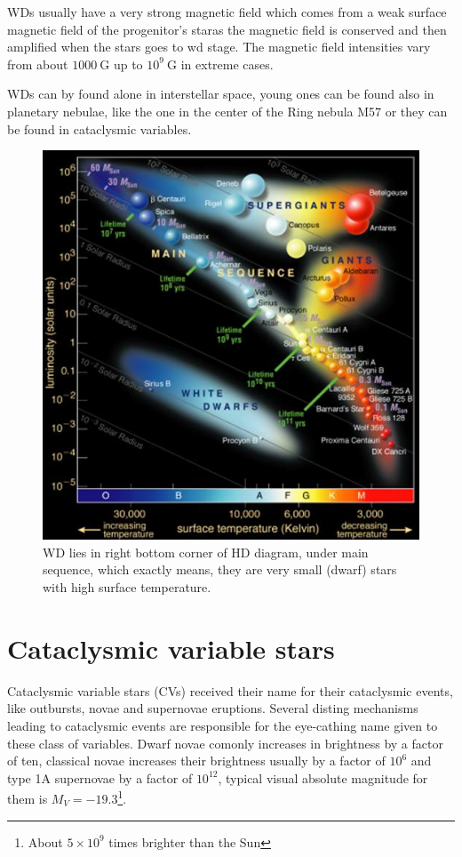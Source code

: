 \documentclass[oneside,a4paper,11pt]{report}
\begin{document}
WDs usually have a very strong magnetic field which comes from a weak surface magnetic field of the progenitor's staras the magnetic 
field is conserved and then amplified when the stars goes to wd stage.  
The magnetic field intensities vary from about $1000 \:\mathrm{G}$ up to $10^9 \:\mathrm{G}$ in extreme cases.    

WDs can by found alone in interstellar space, young ones can be found also in planetary nebulae, like the one in the center of the Ring nebula 
M57 or they can be found in cataclysmic variables.       
 
\begin{figure}[hbt!]
\centering
\includegraphics[totalheight=12cm]{hrdiagram}
\caption{WD lies in right bottom corner of HD diagram, under main 
sequence, which exactly means, they are very small (dwarf) stars with high surface temperature.  }
\label{hrd1} 
\end{figure}


\chapter{Cataclysmic variable stars}

Cataclysmic variable stars (CVs) received their name for their cataclysmic events, like outbursts, novae and supernovae eruptions. 
Several disting mechanisms leading to cataclysmic events are responsible for the eye-cathing name given to these class of variables. 
Dwarf novae comonly increases in brightness by a factor of ten, classical novae increases their 
brightness usually by a factor of $10^6$ and type 1A supernovae by a factor of $10^{12}$, typical visual absolute magnitude 
for them is $M_V = -19.3$\footnote{About $5\times10^9$ times brighter than the Sun}.  
\end{document}
